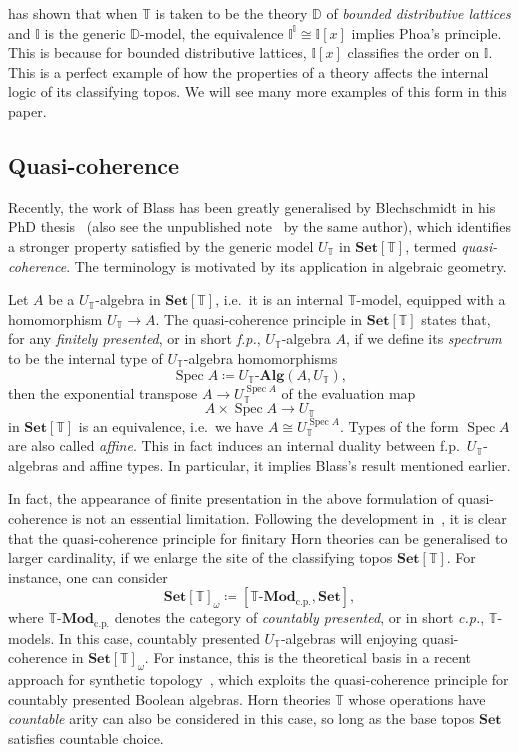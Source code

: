 \documentclass[12pt]{amsart}
\theoremstyle{definition}
\newcommand{\mb}[1]{\mathbf{#1}}
\newcommand{\mbb}[1]{\mathbb{#1}}
\newcommand{\T}{\mbb T}
\newcommand{\I}{\mbb I}
\newcommand{\mr}[1]{\mathrm{#1}}
\newcommand{\Set}{\mb{Set}}
\newcommand{\alg}{\text{-}\mb{Alg}}
\newcommand{\cp}{_{\mr{c.p.}}}
\newcommand{\mmod}[1]{#1\text{-}\mathbf{Mod}}
\newcommand{\spec}{\operatorname{Spec}}
\begin{document}
\citet{gratzer2024directed} has shown that when $\T$ is taken to be the theory $\mbb D$ of \emph{bounded distributive lattices} and $\I$ is the generic $\mbb D$-model, the equivalence $\I^\I \cong \I[x]$ implies Phoa's principle. This is because for bounded distributive lattices, $\I[x]$ classifies the order on $\I$. This is a perfect example of how the properties of a theory affects the internal logic of its classifying topos. We will see many more examples of this form in this paper.

\subsection{Quasi-coherence}\label{subsec:qc}

Recently, the work of Blass has been greatly generalised by Blechschmidt in his PhD thesis~\cite{blechschmidt2021using} (also see the unpublished note~\cite{blechschmidt2020general} by the same author), which identifies a stronger property satisfied by the generic model $U_\T$ in $\Set[\T]$, termed \emph{quasi-coherence}. The terminology is motivated by its application in algebraic geometry.

Let $A$ be a $U_\T$-algebra in $\Set[\T]$, i.e.\ it is an internal $\T$-model, equipped with a homomorphism $U_\T \to A$. The quasi-coherence principle in $\Set[\T]$ states that, for any \emph{finitely presented}, or in short \emph{f.p.}, $U_\T$-algebra $A$, if we define its \emph{spectrum} to be the internal type of $U_\T$-algebra homomorphisms
\[ \spec A \coloneq U_\T\alg(A,U_\T), \]
then the exponential transpose $A\to U_\T^{\spec A}$ of the evaluation map \[ A\times \spec A\to U_\T \]  in $\Set[\T]$ is an equivalence, i.e.\ we have $A \cong U_\T^{\spec A}$.
Types of the form $\spec A$ are also called \emph{affine}. This in fact induces an internal duality between f.p.\ $U_\T$-algebras and affine types. In particular, it implies Blass's result mentioned earlier. 

In fact, the appearance of finite presentation in the above formulation of quasi-coherence is not an essential limitation. Following the development in~\cite{blechschmidt2021using,blechschmidt2020general}, it is clear that the quasi-coherence principle for finitary Horn theories can be generalised to larger cardinality, if we enlarge the site of the classifying topos $\Set[\T]$. For instance, one can consider
\[ \Set[\T]_\omega \coloneq [\mmod\T\cp,\Set], \]
where $\mmod\T\cp$ denotes the category of \emph{countably presented}, or in short \emph{c.p.}, $\T$-models. In this case, countably presented $U_\T$-algebras will enjoying quasi-coherence in $\Set[\T]_\omega$. For instance, this is the theoretical basis in a recent approach for synthetic topology~\cite{cherubini2024foundation}, which exploits the quasi-coherence principle for countably presented Boolean algebras. Horn theories $\T$ whose operations have \emph{countable} arity can also be considered in this case, so long as the base topos $\Set$ satisfies countable choice.
\end{document}
